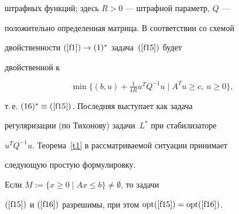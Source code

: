 штрафных функций; здесь $R>0$ --- штрафной параметр, $Q$ ---


положительно определенная матрица. В соответствии со схемой


двойственности $\rf{f1} \to (1)^*$ задача~$\rf{f15}$ будет


двойственной к


\begin{equation}


\label{f16}


\min \{ (b, u) +\tfrac{1}{4R} u^T Q^{-1} u \mid A^Tu\ge c,\ u\ge 0\},


\end{equation}


т.\,е.{} $(16)^* \equiv \rf{f15}$. Последняя выступает как задача


регуляризации (по Тихонову) задачи~$L^*$ при стабилизаторе


$u^T Q^{-1} u$. Теорема~\ref{t1} в рассматриваемой ситуации принимает


следующую простую формулировку.





\begin{assrt}


\label{u2}


Если $M:= \{x\ge 0 \mid Ax\le b\} \ne\emptyset$, то задачи


$\rf{f15}$ и $\rf{f16}$ разрешимы, при этом $\opt\rf{f15}


=\opt\rf{f16}$.


\end{assrt}





